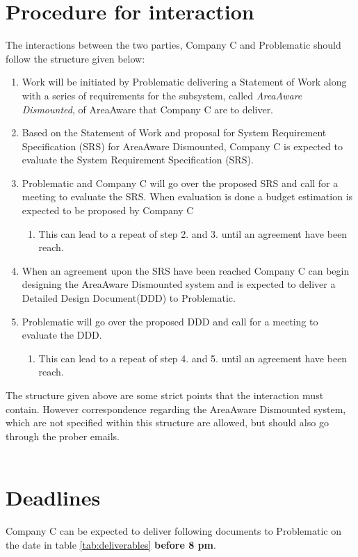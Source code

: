 \chapter{Procedure for interaction}
The interactions between the two parties, Company C and Problematic should follow the structure given below:
\begin{enumerate}
    \item Work will be initiated by Problematic delivering a Statement of Work along with a series of requirements for the subsystem, called \emph{AreaAware Dismounted}, of AreaAware that Company C are to deliver.
    \item Based on the Statement of Work and proposal for System Requirement Specification (SRS) for AreaAware Dismounted, Company C is expected to evaluate the System Requirement Specification (SRS).
    \item Problematic and Company C will go over the proposed SRS and call for a meeting to evaluate the SRS. When evaluation is done a budget estimation is expected to be proposed by Company C
    \begin{enumerate}
        \item This can lead to a repeat of step 2. and 3. until an agreement have been reach.
    \end{enumerate}
    \item When an agreement upon the SRS have been reached Company C can begin designing the AreaAware Dismounted system and is expected to deliver a Detailed Design Document(DDD) to Problematic.
    \item Problematic will go over the proposed DDD and call for a meeting to evaluate the DDD.
    \begin{enumerate}
        \item This can lead to a repeat of step 4. and 5. until an agreement have been reach.
    \end{enumerate}
\end{enumerate}
The structure given above are some strict points that the interaction must contain.
However correspondence regarding the AreaAware Dismounted system, which are not specified within this structure are allowed, but should also go through the prober emails.\\\\


\chapter{Deadlines}
Company C can be expected to deliver following documents to Problematic on the date in table \ref{tab:deliverables} \textbf{before 8 pm}.\\

